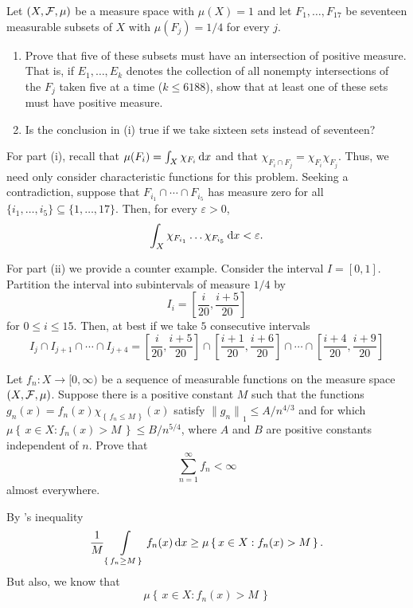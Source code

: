 \begin{problem}
  Let $(X,\mathcal{F},\mu)$ be a measure space with $\mu(X)=1$ and let
  $F_1,\ldots,F_{17}$ be seventeen measurable subsets of $X$ with
  $\mu(F_j)=1/4$ for every $j$.
  \begin{enumerate}[label=(\roman*),noitemsep]
  \item Prove that five of these subsets must have an intersection of
    positive measure. That is, if $E_1,\ldots,E_k$ denotes the collection
    of all nonempty intersections of the $F_j$ taken five at a time ($k\leq
    6188$), show that at least one of these sets must have positive
    measure.
  \item Is the conclusion in (i) true if we take sixteen sets instead of
    seventeen?
  \end{enumerate}
\end{problem}
\begin{solution}
  For part (i), recall that $\mu(F_i)=\int_X\chi_{F_i}\mathop{}\!\mathrm{d} x$ and that
  $\chi_{F_i\cap F_j}=\chi_{F_i}\chi_{F_j}$. Thus, we need only consider
  characteristic functions for this problem. Seeking a contradiction,
  suppose that $F_{i_1}\cap\cdots\cap F_{i_5}$ has measure zero for all
  $\{i_1,\ldots,i_5\}\subseteq\{1,\ldots,17\}$. Then, for every
  $\varepsilon>0$,
  \[
    \int_X\chi_{F_{i_1}}\ldots\chi_{F_{i_5}}\mathop{}\!\mathrm{d} x<\varepsilon.
  \]

  For part (ii) we provide a counter example. Consider the interval
  $I=[0,1]$. Partition the interval into subintervals of measure $1/4$ by
  \[
    I_i=\left[\frac{i}{20},\frac{i+5}{20}\right]
  \]
  for $0\leq i\leq 15$. Then, at best if we take $5$ consecutive intervals
  \[
    I_{j}\cap I_{j+1}\cap\cdots\cap I_{j+4}
    =\left[\frac{i}{20},\frac{i+5}{20}\right]\cap
    \left[\frac{i+1}{20},\frac{i+6}{20}\right]\cap\cdots\cap
    \left[\frac{i+4}{20},\frac{i+9}{20}\right]
  \]
\end{solution}

\begin{problem}
  Let $f_n\colon X\to[0,\infty)$ be a sequence of measurable functions on
  the measure space $(X,\mathcal{F},\mu)$. Suppose there is a positive constant
  $M$ such that the functions
  $g_n(x)=f_n (x)\chi_{\left\{\,f_n\leq M\,\right\}}(x)$ satisfy
  ${\|g_n\|}_1\leq A/n^{4/3}$ and for which
  $\mu\left\{\,x\in X:f_n(x)>M\,\right\}\leq B/n^{5/4}$, where $A$ and $B$
  are positive constants independent of $n$. Prove that
  \[
    \sum_{n=1}^\infty f_n<\infty
  \]
  almost everywhere.
\end{problem}
\begin{solution}
  By 's inequality
  \[
    \frac{1}{M}\int\limits_{\left\{\,f_n\geq M\,\right\}}
    f_n(x)\diff x%
    \geq
    \mu\left\{\,x\in X:f_n(x)>M\,\right\}.
  \]
  But also, we know that
  \[
    \mu\left\{\,x\in X:f_n(x)>M\,\right\}
  \]
\end{solution}

